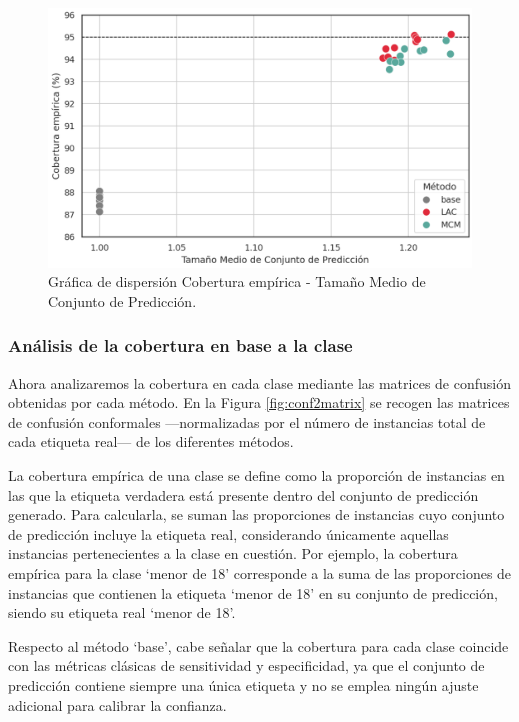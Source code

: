 \begin{figure}[htbp]
    \centering
    \includegraphics[width=\textwidth]{capitulos/cap_05/imagenes/AMM_scatterplot_EC-MPSS.png}
    \caption[
        Gráfica de dispersión Cobertura empírica - Tamaño Medio de Conjunto de Predicción.
    ]{
        Gráfica de dispersión Cobertura empírica - Tamaño Medio de Conjunto de Predicción. 
    }
    \label{fig:AMM_scatterplot_EC-MPSS}
\end{figure}

\FloatBarrier

\subsubsection{Análisis de la cobertura en base a la clase}

Ahora analizaremos la cobertura en cada clase mediante las matrices de confusión obtenidas por cada método. 
En la Figura \ref{fig:conf2matrix} se recogen las matrices de confusión conformales ---normalizadas por el número de instancias total de cada etiqueta real--- de los diferentes métodos. 

La cobertura empírica de una clase se define como la proporción de instancias en las que la etiqueta verdadera está presente dentro del conjunto de predicción generado. Para calcularla, se suman las proporciones de instancias cuyo conjunto de predicción incluye la etiqueta real, considerando únicamente aquellas instancias pertenecientes a la clase en cuestión. Por ejemplo, la cobertura empírica para la clase `menor de 18' corresponde a la suma de las proporciones de instancias que contienen la etiqueta `menor de 18' en su conjunto de predicción, siendo su etiqueta real `menor de 18'.

Respecto al método `base', cabe señalar que la cobertura para cada clase coincide con las métricas clásicas de sensitividad y especificidad, ya que el conjunto de predicción contiene siempre una única etiqueta y no se emplea ningún ajuste adicional para calibrar la confianza.

